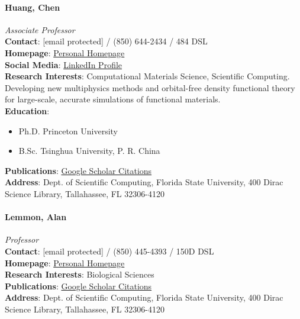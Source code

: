 \documentclass[12pt,a4paper]{article}
\begin{document}
\paragraph{Huang, Chen}
\textit{Associate Professor}\\
\textbf{Contact}: [email protected] / (850) 644-2434 / 484 DSL\\
\textbf{Homepage}: \href{http://people.sc.fsu.edu/~chuang3/}{Personal Homepage}\\
\textbf{Social Media}: \href{https://www.linkedin.com/in/chen-huang-09068010/}{LinkedIn Profile}\\
\textbf{Research Interests}: Computational Materials Science, Scientific Computing. Developing new multiphysics methods and orbital-free density functional theory for large-scale, accurate simulations of functional materials.\\
\textbf{Education}:
\begin{itemize}
    \item Ph.D. Princeton University
    \item B.Sc. Tsinghua University, P. R. China
\end{itemize}
\textbf{Publications}: \href{https://scholar.google.com/citations?user=W4yV4dAAAAAJ}{Google Scholar Citations}\\
\textbf{Address}: Dept. of Scientific Computing, Florida State University, 400 Dirac Science Library, Tallahassee, FL 32306-4120

\paragraph{Lemmon, Alan}
\textit{Professor}\\
\textbf{Contact}: [email protected] / (850) 445-4393 / 150D DSL\\
\textbf{Homepage}: \href{http://lemmon.sc.fsu.edu}{Personal Homepage}\\
\textbf{Research Interests}: Biological Sciences\\
\textbf{Publications}: \href{https://scholar.google.com/citations?user=FxnE47sAAAAJ}{Google Scholar Citations}\\
\textbf{Address}: Dept. of Scientific Computing, Florida State University, 400 Dirac Science Library, Tallahassee, FL 32306-4120
\end{document}
